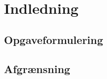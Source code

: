 \documentclass[../SRP.tex]{subfiles}
\begin{document}
\chapter{Indledning}

\section{Opgaveformulering}

\section{Afgrænsning}
\end{document}
